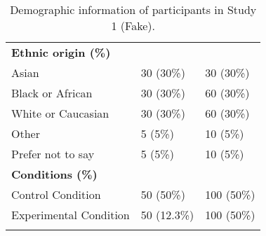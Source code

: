 \begin{longtable}{p{} p{} p{}}
\textbf{Ethnic origin (\%)} & \\
Asian & 30 (30\%) & 30 (30\%) \\
Black or African & 30 (30\%) & 60 (30\%) \\
White or Caucasian & 30 (30\%) & 60 (30\%) \\
Other & 5 (5\%) & 10 (5\%) \\
Prefer not to say & 5 (5\%) & 10 (5\%)\\

\textbf{Conditions (\%)} \\
Control Condition & 50 (50\%) & 100 (50\%) \\
Experimental Condition & 50 (12.3\%) & 100 (50\%) \\
\bottomrule

\captionsetup{justification=raggedright, labelfont=bf, singlelinecheck = false, labelsep=period}
\caption{Demographic information of participants in Study 1 (Fake).}
\label{tab: Study 1 Demographics}
\end{longtable}

